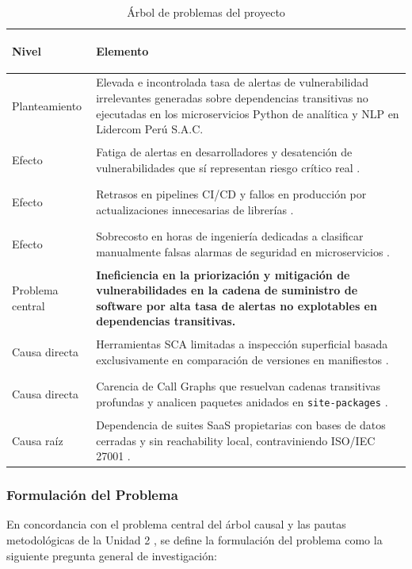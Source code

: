 \begin{table}[H]
\centering
\caption{Árbol de problemas del proyecto}
\label{tab:arbol_problemas_tabla}
\small
{}
\begin{tabularx}{\textwidth}{>{\bfseries\raggedright\arraybackslash}p{4.0cm} X}
\toprule
\textbf{Nivel} & \textbf{Elemento} \\
\midrule
Planteamiento & Elevada e incontrolada tasa de alertas de vulnerabilidad irrelevantes generadas sobre dependencias transitivas no ejecutadas en los microservicios Python de analítica y NLP en Lidercom Perú S.A.C. \\
\addlinespace
Efecto & Fatiga de alertas en desarrolladores y desatención de vulnerabilidades que sí representan riesgo crítico real \parencite{sadowski2018lessons, johnson2013developers}. \\
\addlinespace
Efecto & Retrasos en pipelines CI/CD y fallos en producción por actualizaciones innecesarias de librerías \parencite{bogart2016break, humble2010continuous}. \\
\addlinespace
Efecto & Sobrecosto en horas de ingeniería dedicadas a clasificar manualmente falsas alarmas de seguridad en microservicios \parencite{pashchenko2022vuln4real}. \\
\midrule
Problema central & \textbf{Ineficiencia en la priorización y mitigación de vulnerabilidades en la cadena de suministro de software por alta tasa de alertas no explotables en dependencias transitivas.} \\
\midrule
Causa directa & Herramientas SCA limitadas a inspección superficial basada exclusivamente en comparación de versiones en manifiestos \parencite{vargas2022analisis}. \\
\addlinespace
Causa directa & Carencia de Call Graphs que resuelvan cadenas transitivas profundas y analicen paquetes anidados en \texttt{site-packages} \parencite{salis2021pycg, alfadel2023empirical}. \\
\addlinespace
Causa raíz & Dependencia de suites SaaS propietarias con bases de datos cerradas y sin reachability local, contraviniendo ISO/IEC 27001 \parencite{ladisa2023sok, gutierrez2024auditoria}. \\
\bottomrule
\end{tabularx}
\end{table}

\subsubsection{Formulación del Problema}
En concordancia con el problema central del árbol causal y las pautas metodológicas de la Unidad 2 \parencite{torres2026proyecto}, se define la formulación del problema como la siguiente pregunta general de investigación: %

